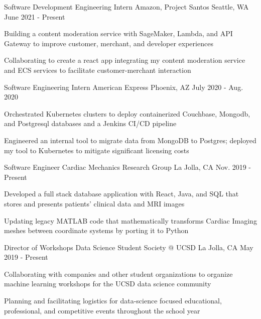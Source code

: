 
\begin{cventries}
  \cventry
    {Software Development Engineering Intern}
    {Amazon, Project Santos}
    {Seattle, WA}
    {June 2021 - Present}
    {
      \begin{cvitems}
          \item {Building a content moderation service with SageMaker, Lambda, and API Gateway to improve customer, merchant, and developer experiences}
          \item {Collaborating to create a react app integrating my content moderation service and ECS services to facilitate customer-merchant interaction}
      \end{cvitems}
    }
  \cventry
    {Software Engineering Intern} %
    {American Express} %
    {Phoenix, AZ} %
    {July 2020 - Aug. 2020} %
    {
      \begin{cvitems} %
        \item {Orchestrated Kubernetes clusters to deploy containerized Couchbase, Mongodb, and Postgresql databases and a Jenkins CI/CD pipeline}
        \item {Engineered an internal tool to migrate data from MongoDB to Postgres; deployed my tool to Kubernetes to mitigate significant licensing costs}
      \end{cvitems}
    }
 
  \cventry
    {Software Engineer} %
    {Cardiac Mechanics Research Group} %
    {La Jolla, CA} %
    {Nov. 2019 - Present} %
    {
      \begin{cvitems} %
        \item {Developed a full stack database application with React, Java, and SQL that stores and presents patients' clinical data and MRI images}
        \item {Updating legacy MATLAB code that mathematically transforms Cardiac Imaging meshes between coordinate systems by porting it to Python }
      \end{cvitems}
    }
  
  \cventry
    {Director of Workshops} %
    {Data Science Student Society @ UCSD} %
    {La Jolla, CA} %
    {May 2019 - Present} %
    {
      \begin{cvitems} %
        \item {Collaborating with companies and other student organizations to organize machine learning workshops for the UCSD data science community}
        \item {Planning and facilitating logistics for data-science focused educational, professional, and competitive events throughout the school year}
      \end{cvitems}
    }


\end{cventries}
